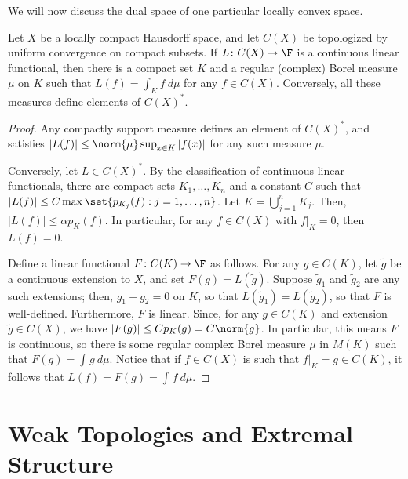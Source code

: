 \documentclass[10pt]{mypackage}
\begin{document}
We will now discuss the dual space of one particular locally convex space.
\begin{proposition}
  Let $X$ be a locally compact Hausdorff space, and let $C(X)$ be topologized by uniform convergence on compact subsets. If $L\colon C(X)\rightarrow \F$ is a continuous linear functional, then there is a compact set $K$ and a regular (complex) Borel measure $\mu$ on $K$ such that $L(f) = \int_{K}^{} f\:d\mu$ for any $f\in C(X)$. Conversely, all these measures define elements of $C(X)^{\ast}$.
\end{proposition}
\begin{proof}
  Any compactly support measure defines an element of $C(X)^{\ast}$, and satisfies $\left\vert L(f) \right\vert \leq \norm{\mu}\sup_{x\in K}\left\vert f(x) \right\vert$ for any such measure $\mu$.

  Conversely, let $L\in C(X)^{\ast}$. By the classification of continuous linear functionals, there are compact sets $K_1,\dots,K_n$ and a constant $C$ such that $\left\vert L(f) \right\vert\leq C \max\set{p_{K_j}(f) : j=1,\dots,n}$. Let $K = \bigcup_{j=1}^{n}K_j$. Then, $\left\vert L(f) \right\vert\leq \alpha p_K(f)$. In particular, for any $f\in C(X)$ with $f|_{K} = 0$, then $L(f) = 0$.

  Define a linear functional $F\colon C(K)\rightarrow \F$ as follows. For any $g\in C(K)$, let $ \widetilde{g} $ be a continuous extension to $X$, and set $F(g) = L\left( \widetilde{g} \right)$. Suppose $ \widetilde{g}_1 $ and $ \widetilde{g}_2 $ are any such extensions; then, $g_1-g_2 = 0$ on $K$, so that $L\left( \widetilde{g}_1 \right) = L\left( \widetilde{g}_2 \right)$, so that $F$ is well-defined. Furthermore, $F$ is linear. Since, for any $g\in C(K)$ and extension $ \widetilde{g}\in C(X) $, we have $\left\vert F(g) \right\vert \leq C p_{K}(g) = C\norm{g}$. In particular, this means $F$ is continuous, so there is some regular complex Borel measure $\mu$ in $M(K)$ such that $F(g) = \int_{}^{} g\:d\mu$. Notice that if $f\in C(X)$ is such that $f|_{K} = g\in C(K)$, it follows that $L(f) = F(g) = \int_{}^{} f\:d\mu$.
\end{proof}
\section{Weak Topologies and Extremal Structure}%
\end{document}
